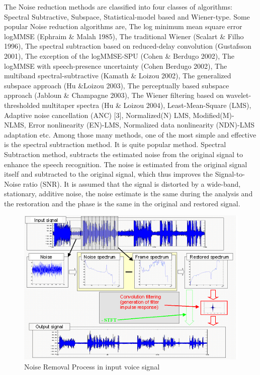 \begin{enumerate}
	The Noise reduction methods are classified into four classes of algorithms: Spectral Subtractive, Subspace, Statistical-model based and Wiener-type. Some popular Noise reduction algorithms are, The log minimum mean square error logMMSE (Ephraim \& Malah 1985), The traditional Wiener (Scalart \& Filho 1996), The spectral subtraction based on reduced-delay convolution (Gustafsson 2001), The exception of the logMMSE-SPU (Cohen \& Berdugo 2002), The logMMSE with speech-presence uncertainty (Cohen Berdugo 2002), The multiband spectral-subtractive (Kamath \& Loizou 2002), The generalized subspace approach (Hu \&Loizou 2003), The perceptually based subspace approach (Jabloun \& Champagne 2003), The Wiener filtering based on wavelet-thresholded multitaper spectra (Hu \& Loizou 2004), Least-Mean-Square (LMS), Adaptive noise cancellation (ANC) [3], Normalized(N) LMS, Modified(M)- NLMS, Error nonlinearity (EN)-LMS, Normalized data nonlinearity (NDN)-LMS adaptation etc. 
	Among those many methods, one of the most simple and effective is the spectral subtraction method. It is quite popular method. Spectral Subtraction method, subtracts the estimated noise from the original signal to enhance the speech recognition. The noise is estimated from the original signal itself and subtracted to the original signal, which thus improves the Signal-to-Noise ratio (SNR). It is assumed that the signal is distorted by a wide-band, stationary, additive noise, the noise estimate is the same during the analysis and the restoration and the phase is the same in the original and restored signal.
	\begin{figure}
		\begin{center}
			\includegraphics[scale=0.8]{images/image_2.png}
			\caption{Noise Removal Process in input voice signal}
		\end{center}
	\end{figure}
	
\end{enumerate}
